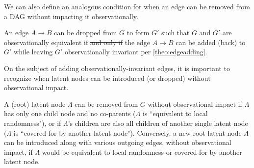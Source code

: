 We can also define an analogous condition for when an edge can be removed from a DAG without impacting it observationally.
\begin{corollary}\label{cor:edgedropping}
An edge $A\to B$ can be dropped from $G$ to form $G'$ such that $G$ and $G'$ are observationally equivalent if \sout{and only if} the edge $A\to B$ can be added (back) to $G'$ while leaving $G'$ observationally invariant per \cref{theo:edgeadding}.
\end{corollary}

On the subject of adding observationally-invariant edges, it is important to recognize when latent nodes can be introduced (or dropped) without observational impact.
\begin{theorem}\label{theo:latentadding}
A (root) latent node $\Lambda$ can be removed from $G$ without observational impact if $\Lambda$ has only one child node and no co-parents ($\Lambda$ is ``equivalent to local randomness"), or if $\Lambda$'s children are also all children of another single latent node ($\Lambda$ is ``covered-for by another latent node"). Conversely, a new root latent node $\Lambda$ can be introduced along with various outgoing edges, without observational impact, if $\Lambda$ would be equivalent to local randomness or covered-for by another latent node.
\end{theorem}

